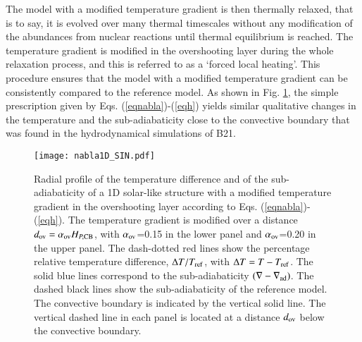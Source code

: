 \documentclass[traditabstract]{aa}
\newcommand{\3}{\ss}
\begin{document}
{ %
 The model with a modified temperature gradient is then thermally relaxed, that is to say, it is evolved over many thermal timescales without any modification of the abundances from nuclear reactions until thermal equilibrium is reached. The temperature gradient is modified in the overshooting layer during the whole relaxation process, and this is referred to as a `forced local heating'.
 This procedure ensures that the model with a modified temperature gradient can be consistently compared to the reference model. As shown in Fig. \ref{nabla1D_fig}, the simple prescription given by Eqs. (\ref{eqnabla})-(\ref{eqh}) yields similar qualitative changes in the temperature and the sub-adiabaticity  close to the convective boundary that was found in the hydrodynamical simulations of B21.

\begin{figure}[h!]
\texttt{[image: nabla1D\_SIN.pdf]}
   \caption{Radial profile of the temperature difference and of the sub-adiabaticity of a 1D solar-like structure with a modified temperature gradient in the overshooting layer according to Eqs. (\ref{eqnabla})-(\ref{eqh}). The temperature gradient is modified over a distance  $d_{\rm ov} = \alpha_{\rm ov} H_{P,{\rm CB}}$, with $\alpha_{\rm ov}$=0.15 in the lower panel and $\alpha_{\rm ov}$=0.20 in the upper panel.
  The dash-dotted red lines show the percentage relative temperature difference, $\Delta T / T_{\rm ref}$, with $\Delta T = T-T_{\rm ref}$. The solid blue lines correspond to the sub-adiabaticity $(\nabla - \nabla_{\rm ad})$. The dashed black lines show the sub-adiabaticity of the reference model. The convective boundary is indicated by the vertical solid line. The  vertical dashed line in each panel is located at a distance $d_{\rm ov}$ below the convective boundary. }
 \label{nabla1D_fig}
\end{figure}


}
\end{document}
